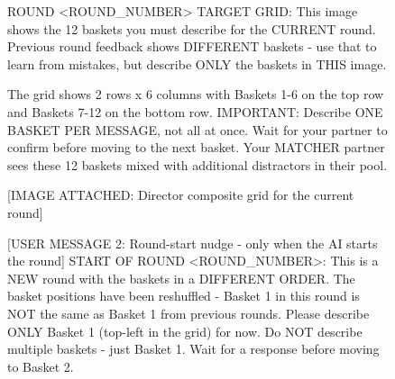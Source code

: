 \begin{figure}[t]
\begin{promptbox}
ROUND <ROUND_NUMBER> TARGET GRID: This image shows the 12 baskets you must describe for the CURRENT round. Previous round feedback shows DIFFERENT baskets - use that to learn from mistakes, but describe ONLY the baskets in THIS image.

The grid shows 2 rows x 6 columns with Baskets 1-6 on the top row and Baskets 7-12 on the bottom row. IMPORTANT: Describe ONE BASKET PER MESSAGE, not all at once. Wait for your partner to confirm before moving to the next basket. Your MATCHER partner sees these 12 baskets mixed with additional distractors in their pool.

[IMAGE ATTACHED: Director composite grid for the current round]

[USER MESSAGE 2: Round-start nudge - only when the AI starts the round]
START OF ROUND <ROUND_NUMBER>: This is a NEW round with the baskets in a DIFFERENT ORDER. The basket positions have been reshuffled - Basket 1 in this round is NOT the same as Basket 1 from previous rounds. Please describe ONLY Basket 1 (top-left in the grid) for now. Do NOT describe multiple baskets - just Basket 1. Wait for a response before moving to Basket 2.
\end{promptbox}
\end{figure}

